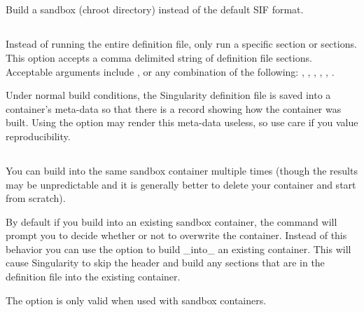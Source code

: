 \documentclass[letterpaper,10pt,english]{sphinxmanual}
\begin{document}
\subsection{}
\label{\detokenize{build_a_container:sandbox}}
Build a sandbox (chroot directory) instead of the default SIF format.


\subsection{}
\label{\detokenize{build_a_container:section}}
Instead of running the entire definition file, only run a specific section or
sections.  This option accepts a comma delimited string of definition file
sections.  Acceptable arguments include ,  or any combination of
the following: , , , , ,
.

Under normal build conditions, the Singularity definition file is saved into
a container’s meta-data so that there is a record showing how the container was
built. Using the  option may render this meta-data useless, so use
care if you value reproducibility.


\subsection{}
\label{\detokenize{build_a_container:update}}
You can build into the same sandbox container multiple times (though the results
may be unpredictable and it is generally better to delete your container and
start from scratch).

By default if you build into an existing sandbox container, the  
command will prompt you to decide whether or not to overwrite the container.
Instead of this behavior you can use the  option to build \_into\_ an
existing container. This will cause Singularity to skip the header and build
any sections that are in the definition file into the existing container.

The  option is only valid when used with sandbox containers.
\end{document}
